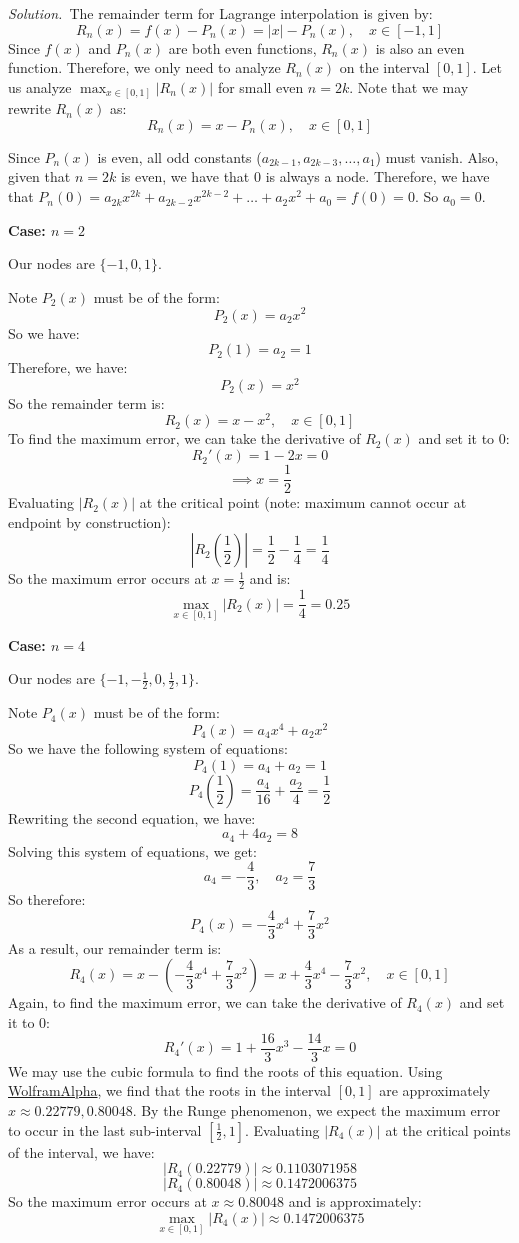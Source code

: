 \documentclass[12pt]{article}
\newcommand{\solution}
    {\par\vspace{0.5em}\noindent\emph{Solution.}\ }
    {\par\vspace{1em}}
\begin{document}
\solution The remainder term for Lagrange interpolation is given by:
\[R_n(x) = f(x) - P_n(x) = |x| - P_n(x), \quad x \in [-1, 1]\]
Since $f(x)$ and $P_n(x)$ are both even functions, $R_n(x)$ is also an even function. Therefore, we only need to analyze $R_n(x)$ on the interval $[0, 1]$. Let us analyze $\max_{x \in [0,1]} |R_n(x)|$ for small even $n=2k$.
Note that we may rewrite $R_n(x)$ as:
\[R_n(x) = x - P_n(x), \quad x \in [0, 1]\]

Since $P_n(x)$ is even, all odd constants ($a_{2k-1}, a_{2k-3}, \ldots, a_1$) must vanish. Also, given that $n=2k$ is even, we have that $0$ is always a node. Therefore, we have that $P_n(0) = a_{2k}x^{2k} + a_{2k-2}x^{2k-2} + \dots + a_2x^2 + a_0 = f(0) = 0$. So $a_0 = 0$.

\textbf{Case: $n=2$}

Our nodes are $\{-1, 0, 1\}$.

Note $P_2(x)$ must be of the form: 
\[P_2(x) = a_2x^2\]
So we have:
\[P_2(1) = a_2 = 1\] 
Therefore, we have:
\[P_2(x) = x^2\]
So the remainder term is:
\[R_2(x) = x - x^2, \quad x \in [0, 1]\]
To find the maximum error, we can take the derivative of $R_2(x)$ and set it to $0$:
\[R_2'(x) = 1 - 2x = 0\]
\[\implies x = \frac{1}{2}\]
Evaluating $|R_2(x)|$ at the critical point (note: maximum cannot occur at endpoint by construction):
\[|R_2\left(\frac{1}{2}\right)| = \frac{1}{2} - \frac{1}{4} = \frac{1}{4}\]
So the maximum error occurs at $x = \frac{1}{2}$ and is:
\[\max_{x \in [0,1]} |R_2(x)| =\frac{1}{4} = 0.25\] 

\textbf{Case: $n=4$}

Our nodes are $\{-1, -\frac{1}{2}, 0, \frac{1}{2}, 1\}$.

Note $P_4(x)$ must be of the form:
\[P_4(x) = a_4x^4 + a_2x^2\]
So we have the following system of equations:
\[P_4(1) = a_4 + a_2 = 1\]
\[P_4\left(\frac{1}{2}\right) = \frac{a_4}{16} + \frac{a_2}{4} = \frac{1}{2}\]
Rewriting the second equation, we have:
\[a_4 + 4a_2 = 8\]
Solving this system of equations, we get:
\[a_4 = -\frac{4}{3}, \quad a_2 = \frac{7}{3}\]
So therefore:
\[P_4(x) = -\frac{4}{3}x^4 + \frac{7}{3}x^2\]
As a result, our remainder term is:
\[R_4(x) = x - \left(-\frac{4}{3}x^4 + \frac{7}{3}x^2\right) = x + \frac{4}{3}x^4 - \frac{7}{3}x^2, \quad x \in [0, 1]\]
Again, to find the maximum error, we can take the derivative of $R_4(x)$ and set it to $0$:
\[R_4'(x) = 1 + \frac{16}{3}x^3 - \frac{14}{3}x = 0\]
We may use the cubic formula to find the roots of this equation. Using \href{https://www.wolframalpha.com/widgets/view.jsp?id=3f4366aeb9c157cf9a30c90693eafc55}{WolframAlpha}, we find that the roots in the interval $[0,1]$ are approximately $x \approx 0.22779, 0.80048$. By the Runge phenomenon, we expect the maximum error to occur in the last sub-interval $[\frac{1}{2}, 1]$. Evaluating $|R_4(x)|$ at the critical points of the interval, we have:
\[|R_4(0.22779)| \approx 0.1103071958\]
\[|R_4(0.80048)| \approx 0.1472006375\]
So the maximum error occurs at $x \approx 0.80048$ and is approximately:
\[\max_{x \in [0,1]} |R_4(x)| \approx 0.1472006375\]
\end{document}
